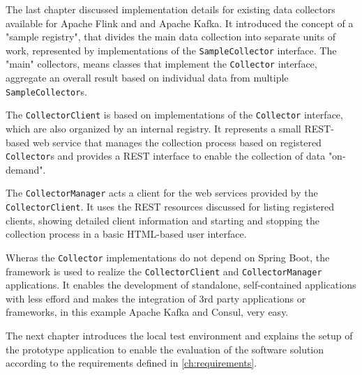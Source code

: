 The last chapter discussed implementation details for existing data collectors available for Apache Flink and and Apache Kafka.
It introduced the concept of a "sample registry", that divides the main data collection into separate units of work, represented
by implementations of the \verb|SampleCollector| interface. The "main" collectors, means classes that implement the \verb|Collector|
interface, aggregate an overall result based on individual data from multiple \verb|SampleCollector|s.

The \verb|CollectorClient| is based on implementations of the \verb|Collector| interface, which are also organized by an internal registry.
It represents a small REST-based web service that manages the collection process based on registered \verb|Collector|s and provides a REST
interface to enable the collection of data "on-demand".

The \verb|CollectorManager| acts a client for the web services provided by the \verb|CollectorClient|. It uses the REST resources discussed
for listing registered clients, showing detailed client information and starting and stopping the collection process in a basic
HTML-based user interface.

Wheras the \verb|Collector| implementations do not depend on Spring Boot, the framework is used to realize the \verb|CollectorClient| and
\verb|CollectorManager| applications. It enables the development of standalone, self-contained applications with less efford and makes
the integration of 3rd party applications or frameworks, in this example Apache Kafka and Consul, very easy.

The next chapter introduces the local test environment and explains the setup of the prototype application to enable the
evaluation of the software solution according to the requirements defined in \autoref{ch:requirements}.
